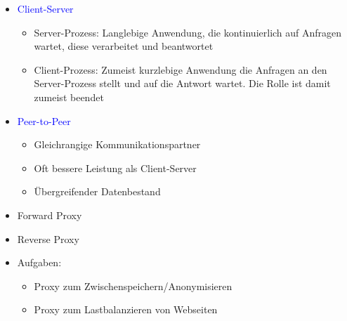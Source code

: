 
\begin{itemize}
    \item \textcolor{blue}{Client-Server}
    \begin{itemize}
        \item Server-Prozess: Langlebige Anwendung, die kontinuierlich auf Anfragen wartet, diese verarbeitet und beantwortet
        \item Client-Prozess: Zumeist kurzlebige Anwendung die Anfragen an den Server-Prozess stellt und auf die Antwort wartet. Die Rolle ist damit zumeist beendet
    \end{itemize}
    \item \textcolor{blue}{Peer-to-Peer}
    \begin{itemize}
        \item Gleichrangige Kommunikationspartner
        \item Oft bessere Leistung als Client-Server
        \item Übergreifender Datenbestand
    \end{itemize}
\end{itemize}

\begin{itemize}
    \item Forward Proxy
    \item Reverse Proxy
    \item Aufgaben:
    \begin{itemize}
        \item Proxy zum Zwischenspeichern/Anonymisieren
        \item Proxy zum Lastbalanzieren von Webseiten
    \end{itemize}
\end{itemize}

